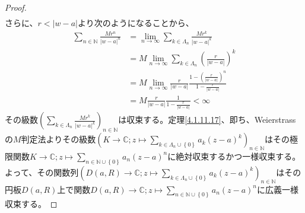 \documentclass[dvipdfmx]{jsarticle}
\begin{document}
\begin{proof}
\begin{align*}
\end{align*}
さらに、$r < |w - a|$より次のようになることから、
\begin{align*}
\sum_{n \in \mathbb{N}} \frac{Mr^{n}}{|w - a|^{n}} &= \lim_{n \rightarrow \infty}{\sum_{k \in \varLambda_{n}} \frac{Mr^{k}}{|w - a|^{k}}}\\
&= M\lim_{n \rightarrow \infty}{\sum_{k \in \varLambda_{n}} \left( \frac{r}{|w - a|} \right)^{k}}\\
&= M\lim_{n \rightarrow \infty}{\frac{r}{|w - a|}\frac{1 - \left( \frac{r}{|w - a|} \right)^{n}}{1 - \frac{r}{|w - a|}}}\\
&= M\frac{r}{|w - a|}\frac{1}{1 - \frac{r}{|w - a|}} < \infty
\end{align*}
その級数$\left( \sum_{k \in \varLambda_{n}} \frac{Mr^{k}}{|w - a|^{k}} \right)_{n \in \mathbb{N}}$は収束する。定理\ref{4.1.11.17}、即ち、Weierstrassの$M$判定法よりその級数$\left( K \rightarrow \mathbb{C};z \mapsto \sum_{k \in \varLambda_{n} \cup \left\{ 0 \right\}} {a_{k}(z - a)^{k}} \right)_{n \in \mathbb{N}}$はその極限関数$K \rightarrow \mathbb{C};z \mapsto \sum_{n \in \mathbb{N} \cup \left\{ 0 \right\}} {a_{n}(z - a)^{n}}$に絶対収束するかつ一様収束する。よって、その関数列$\left( D(a,R) \rightarrow \mathbb{C};z \mapsto \sum_{k \in \varLambda_{n} \cup \left\{ 0 \right\}} {a_{k}(z - a)^{k}} \right)_{n \in \mathbb{N}}$はその円板$D(a,R)$上で関数$D(a,R) \rightarrow \mathbb{C};z \mapsto \sum_{n \in \mathbb{N} \cup \left\{ 0 \right\}} {a_{n}(z - a)^{n}}$に広義一様収束する。
\end{proof}
\end{document}
